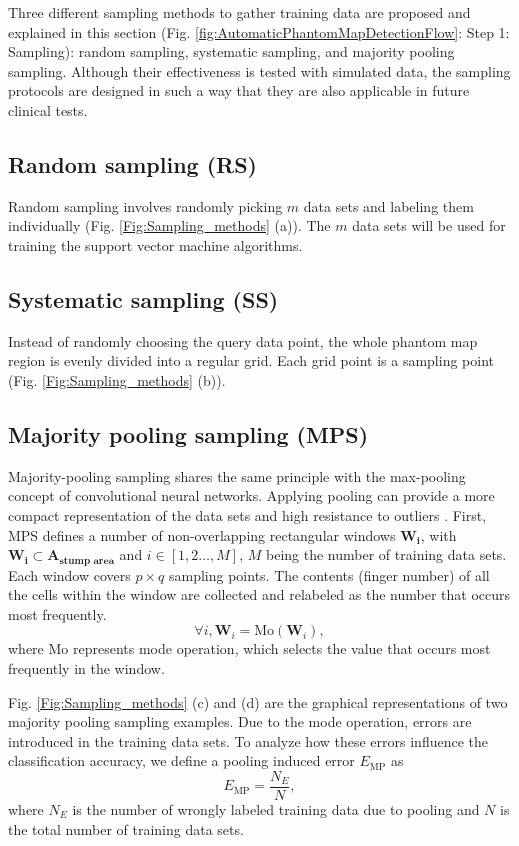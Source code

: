 Three different sampling methods to gather training data are proposed and explained in this section (Fig. \ref{fig:AutomaticPhantomMapDetectionFlow}: Step 1: Sampling): random sampling, systematic sampling, and majority pooling sampling. Although their effectiveness is tested with simulated data, the sampling protocols are designed in such a way that they are also applicable in future clinical tests.

\subsection{Random sampling (RS)}
Random sampling involves randomly picking $m$ data sets and labeling  them individually (Fig. \ref{Fig:Sampling_methods} (a)). The $m$ data sets will be used for training the support vector machine algorithms. 


\subsection{Systematic sampling (SS)}
Instead of randomly choosing the query data point, the whole phantom map region is evenly divided into a regular grid. Each grid point is a sampling point (Fig. \ref{Fig:Sampling_methods} (b)). 

\subsection{Majority pooling sampling (MPS)}
\label{subsec:MPS}
Majority-pooling sampling shares the same principle with the max-pooling concept of convolutional neural networks.  
Applying pooling can provide a more compact representation of the data sets and high resistance to outliers \cite{boureau2010theoretical}.
First, MPS defines a number of non-overlapping rectangular windows $\boldsymbol{W_{i}}$, with $\boldsymbol{W_{i}} \subset \boldsymbol{A_{\text{stump area}}}$ and $i \in [1, 2 \dots, M]$, $M$ being the number of training data sets. Each window covers $p \times q$ sampling points.  The contents (finger number) of all the cells within the window are collected and relabeled as the number that occurs most frequently. 
\begin{equation}
\label{eq:MajorityPooling}
\forall i, \boldsymbol{W}_{i} = \text{Mo}(\boldsymbol{W}_{i}),
\end{equation}
where $\text{Mo}$ represents mode operation, which selects the value that occurs most frequently in the window.

Fig. \ref{Fig:Sampling_methods} (c) and (d) are the graphical representations of two majority pooling sampling examples.  Due to the mode operation, errors are introduced in the training data sets. To analyze how these errors influence the classification accuracy, we define a pooling induced error $E_{\text{MP}}$ as
\begin{equation}
\label{Eq:EMP}
 E_{\text{MP}} = \frac{N_E}{N},
\end{equation}
where $N_E$ is the number of wrongly labeled training data due to pooling and $N$ is the total number of training data sets.



